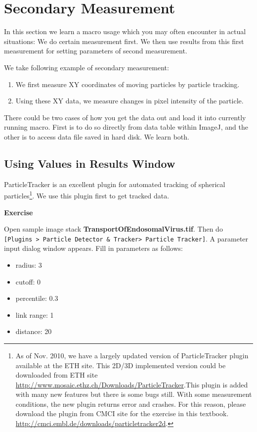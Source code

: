 \documentclass[11pt,a4paper,oneside]{report}
\newenvironment{indentexercise}[1]%
{{\setlength{\leftmargin}{2em}}%
\textbf{Exercise \thesubsection-#1}%
\begin{list}{}%
	\item%
}
{\end{list}}
\newcommand{\ijmenu}[1]{\texttt{\small#1}}
\begin{document}
\section{Secondary Measurement}
In this section we learn a macro usage which you may often encounter in actual situations: 
We do certain measurement first. We then use results from this first measurement for 
setting parameters of second measurement.  

We take following example of secondary measurement: 
\begin{enumerate}
\item We first measure XY coordinates of moving particles by particle tracking.  
\item Using these XY data, we measure changes in pixel intensity of the particle.
\end{enumerate} 
There could be two cases of how you get the data out and load it into currently running macro. 
First is to do so directly from data table within ImageJ, 
and the other is to access data file saved in hard disk. We learn both. 

\subsection{Using Values in Results Window}

ParticleTracker is an excellent plugin for automated tracking of spherical particles\footnote{ As of Nov. 2010, we have a largely updated version of ParticleTracker plugin available at the ETH site. This 2D/3D implemented version could be downloaded from ETH site \url{
http://www.mosaic.ethz.ch/Downloads/ParticleTracker}.This plugin is added with many new features but there is some bugs still. With some measurement conditions, the new plugin returns error and crashes. For this reason, please download the plugin from CMCI site for the exercise in this textbook. \url{http://cmci.embl.de/downloads/particletracker2d}.  }. We use this plugin first to get tracked data. 

\begin{indentexercise}{1}
\item Open sample image stack \textbf{TransportOfEndosomalVirus.tif}. Then do \ijmenu{[Plugins > Particle Detector \& Tracker> Particle Tracker]}. A parameter input dialog window appears. Fill in  parameters as follows:
\begin{itemize}
\item radius: 3
\item cutoff: 0
\item percentile: 0.3
\item link range: 1
\item distance: 20
\end{itemize}
\end{indentexercise}
\end{document}
